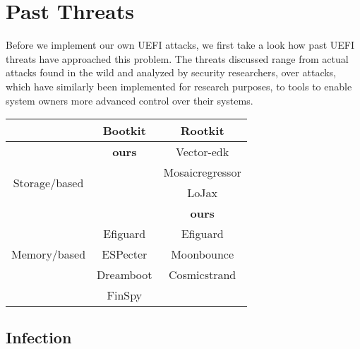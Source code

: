 
\chapter{Past Threats}


Before we implement our own \ac{UEFI} attacks, we first take a look how past \ac{UEFI} threats have approached this problem.
The threats discussed range from actual attacks found in the wild and analyzed by security researchers, over attacks, which have similarly been implemented for research purposes, to tools to enable system owners more advanced control over their systems.

\begin{center}
    \begin{tabular}{c|c|c}
                                           & Bootkit       & Rootkit         \\
        \hline
        \multirow{4}{4em}{Storage\-/based} & \textbf{ours} & Vector-edk      \\
                                           &               & Mosaicregressor \\
                                           &               & LoJax           \\
                                           &               & \textbf{ours}   \\
        \hline
        \multirow{3}{4em}{Memory\-/based}  & Efiguard      & Efiguard        \\
                                           & ESPecter      & Moonbounce      \\
                                           & Dreamboot     & Cosmicstrand    \\
                                           & FinSpy        &                 \\
    \end{tabular}
\end{center}

\section{Infection}

